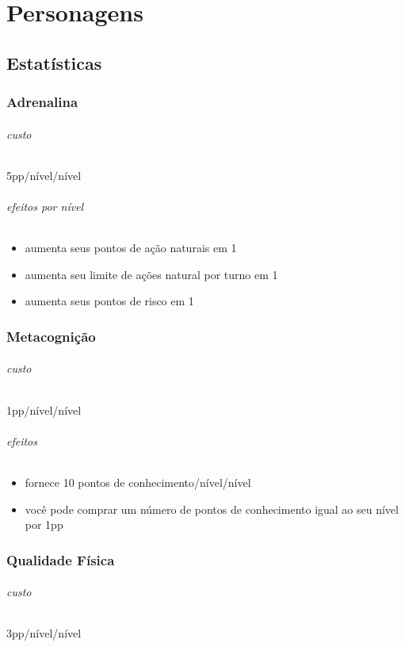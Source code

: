 \part{Personagens}
\chapter{Estatísticas}
\section{Adrenalina}
\paragraph{custo} 5pp/nível/nível
\paragraph{efeitos por nível}
\begin{itemize}
  \item aumenta seus pontos de ação naturais em 1
  \item aumenta seu limite de ações natural por turno em 1
  \item aumenta seus pontos de risco em 1
\end{itemize}
%
%
\section{Metacognição}
\paragraph{custo} 1pp/nível/nível
\paragraph{efeitos} 
\begin{itemize}
  \item fornece 10 pontos de conhecimento/nível/nível
  \item você pode comprar um número de pontos de conhecimento igual ao seu nível por 1pp
\end{itemize}
%
%
\section{Qualidade Física}
\paragraph{custo} 3pp/nível/nível
